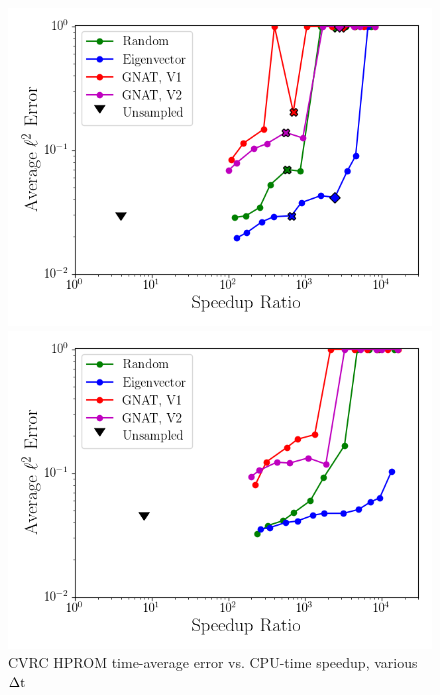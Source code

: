 \begin{figure}
	\begin{minipage}{0.49\linewidth}
		\includegraphics[width=0.99\linewidth]{Chapters/HPROMResults/Images/cvrc/deim/sampled_dt5e-7_Average_errorRaw_pareto.png}
		\subcaption{\label{fig:cvrcSampledROMErrVsTimeDt5e-7}$\dt = 5 \times \dtFOM$}
	\end{minipage}
	\begin{minipage}{0.49\linewidth}
		\includegraphics[width=0.99\linewidth]{Chapters/HPROMResults/Images/cvrc/deim/sampled_dt1e-6_Average_errorRaw_pareto.png}
		\subcaption{$\dt = 10 \times \dtFOM$}
	\end{minipage}
	\caption{\label{fig:cvrcSampledROMErrVsTime}CVRC HPROM time-average error vs. CPU-time speedup, various $\Delta \text{t}$}
\end{figure}

